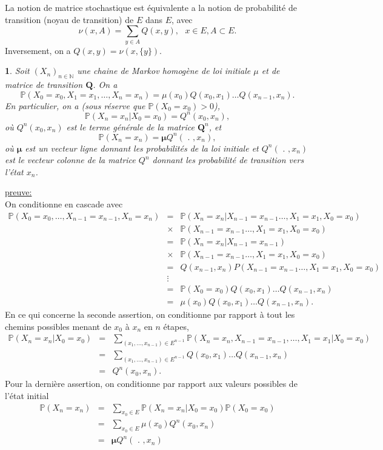 \documentclass[8pt,notheorems]{beamer}
\def \N{\mathbb N}
\def \P {\mathbb P}
\newtheorem{prop}{\translate{Proposition}}
\theoremstyle{definition}
\theoremstyle{example}
\theoremstyle{mystyle}
\theoremstyle{plain}
\begin{document}
\begin{frame}[allowframebreaks]
La notion de matrice stochastique est équivalente a la notion de probabilité de transition (noyau de transition) de $E$ dans $E$, avec
$$
\nu(x,A) = \sum_{y\in A}Q(x,y),\text{ }x\in E,A\subset E.
$$
Inversement, on a $Q(x,y) = \nu(x,\{y\})$.
\begin{prop}
Soit $(X_n)_{n\in\N}$ une chaine de Markov homogène de loi initiale $\mu$ et de matrice de transition $\mathbf{Q}$. On a
$$
\P(X_0 = x_0,X_1 = x_1,\ldots, X_n = x_n) = \mu(x_0)Q(x_0,x_1)\ldots Q(x_{n-1},x_n).
$$
En particulier, on a (sous réserve que $\P(X_0 = x_0)>0$),
$$
\P(X_n = x_n|X_0 = x_0) = Q^{n}(x_0, x_n),
$$
où $Q^{n}(x_0, x_n)$ est le terme générale de la matrice $\mathbf{Q}^{n}$, et
$$
\P(X_n = x_n) =  \boldsymbol{\mu} Q^{n}(\text{ . } , x_n),
$$
où $\boldsymbol{\mu}$ est un vecteur ligne donnant les probabilités de la loi initiale et $Q^{n}(\text{ . } , x_n)$ est le vecteur colonne de la matrice $Q^{n}$ donnant les probabilité de transition vers l'état $x_n$.
\end{prop}
\underline{preuve:}\\
On conditionne en cascade avec
\begin{eqnarray*}
\P(X_0 = x_0, \ldots, X_{n-1} = x_{n-1}, X_n = x_n) &=& \P(X_n = x_n|X_{n-1} = x_{n-1}\ldots, X_{1} = x_{1}, X_0 = x_0)\\
&\times&\P(X_{n-1} = x_{n-1}\ldots, X_{1} = x_{1}, X_0 = x_0)\\
&=& \P(X_n = x_n|X_{n-1} = x_{n-1})\\
&\times&\P(X_{n-1} = x_{n-1}\ldots, X_{1} = x_{1}, X_0 = x_0)\\
&=& Q(x_{n-1},x_n)P(X_{n-1} = x_{n-1}\ldots, X_{1} = x_{1}, X_0 = x_0)\\
&\vdots&\\
&=&\P(X_0= x_0)Q(x_0,x_1)\ldots Q(x_{n-1}, x_n)\\
&=&\mu(x_0)Q(x_0,x_1)\ldots Q(x_{n-1}, x_n).
\end{eqnarray*}
En ce qui concerne la seconde assertion, on conditionne par rapport à tout les chemins possibles menant de $x_0$ à $x_n$ en $n$ étapes,
\begin{eqnarray*}
\P(X_n = x_n|X_0 = x_0) &=& \sum_{(x_1,\ldots, x_{n-1})\in E^{n-1}}\P(X_n = x_n, X_{n-1} = x_{n-1},\ldots, X_1 = x_1|X_0 = x_0) \\
&=& \sum_{(x_1,\ldots, x_{n-1})\in E^{n-1}}Q(x_0,x_1)\ldots Q(x_{n-1}, x_n)\\
&=&Q^{n}(x_0,x_n).
\end{eqnarray*}
Pour la dernière assertion, on conditionne par rapport aux valeurs possibles de l'état initial
\begin{eqnarray*}
\P(X_n = x_n) &=& \sum_{x_0\in E}\P(X_n = x_n|X_0 = x_0)\P(X_0 = x_0)\\
&=& \sum_{x_0\in E}\mu(x_0)Q^n(x_0,x_n)\\
&=& \boldsymbol{\mu}Q^n(\text{ . },x_n)
\end{eqnarray*}
\end{frame}
\end{document}
